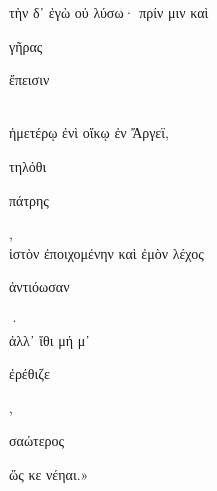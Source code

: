\documentclass{ransom}
\begin{document}
\begin{foreignpage}
\begin{graytext}
τὴν δ᾽ ἐγὼ οὐ λύσω· πρίν μιν καὶ \begin{whitetext}γῆρας\end{whitetext} \begin{whitetext}ἔπεισιν\end{whitetext}\\
ἡμετέρῳ ἐνὶ οἴκῳ ἐν Ἄργεϊ, \begin{whitetext}τηλόθι\end{whitetext} \begin{whitetext}πάτρης\end{whitetext},\hfill{}\\
ἱστὸν ἐποιχομένην καὶ ἐμὸν λέχος \begin{whitetext}ἀντιόωσαν\end{whitetext}·\\
ἀλλ᾽ ἴθι μή μ᾽ \begin{whitetext}ἐρέθιζε\end{whitetext}, \begin{whitetext}σαώτερος\end{whitetext} ὥς κε νέηαι.»\\

\end{graytext}


\end{foreignpage}
\end{document}
